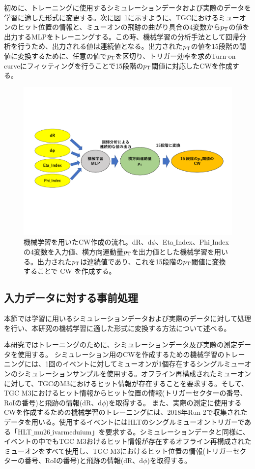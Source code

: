 初めに、トレーニングに使用するシミュレーションデータおよび実際のデータを学習に適した形式に変更する。次に図~\ref{fig:MLP_over}に示すように、TGCにおけるミューオンのヒット位置の情報と、ミューオンの飛跡の曲がり具合の4変数から$p_{\rm{T}}$の値を出力するMLPをトレーニングする。この時、機械学習の分析手法として回帰分析を行うため、出力される値は連続値となる。出力された$p_{\rm{T}}$の値を15段階の閾値に変換するために、任意の値で$p_{\rm{T}}$を区切り、トリガー効率を求めTurn-on curveにフィッティングを行うことで15段階の$p_{\rm{T}}$閾値に対応したCWを作成する。

\begin{figure}[tb]
  \centering
  \hspace*{-1cm}
  \includegraphics[clip, width=15cm]{fig/4/MLPoverview2.pdf}
  \caption{機械学習を用いたCW作成の流れ。dR、d$\phi$、Eta$\_$Index、Phi$\_$Indexの4変数を入力値、横方向運動量$p_{\rm{T}}$を出力値とした機械学習を用いる。出力された$p_{\rm{T}}$は連続値であり、これを15段階の$p_{\rm{T}}$閾値に変換することで CW を作成する。}
  \label{fig:MLP_over}
\end{figure}

\subsection{入力データに対する事前処理}\label{事前処理}
本節では学習に用いるシミュレーションデータおよび実際のデータに対して処理を行い、本研究の機械学習に適した形式に変換する方法について述べる。

本研究ではトレーニングのために、シミュレーションデータ及び実際の測定データを使用する。
シミュレーション用のCWを作成するための機械学習のトレーニングには、1回のイベントに対してミューオンが1個存在するシングルミューオンのシミュレーションサンプルを使用する。オフライン再構成されたミューオンに対して、TGCのM3におけるヒット情報が存在することを要求する。そして、TGC M3におけるヒット情報からヒット位置の情報(トリガーセクターの番号、RoIの番号)と飛跡の情報(dR、d$\phi$)を取得する。
また、実際の測定に使用するCWを作成するための機械学習のトレーニングには、2018年Run-2で収集されたデータを用いる。使用するイベントにはHLTのシングルミューオントリガーである「HLT$\_$mu26$\_$ivarmeduium」を要求する。シミュレーションデータと同様に、イベントの中でもTGC M3おけるヒット情報が存在するオフライン再構成されたミューオンをすべて使用し、TGC M3におけるヒット位置の情報(トリガーセクターの番号、RoIの番号)と飛跡の情報(dR、d$\phi$)を取得する。

